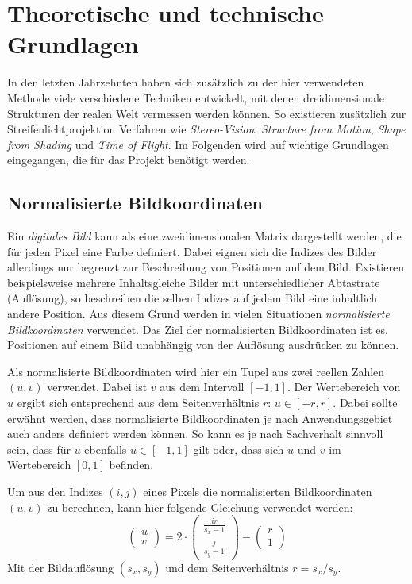 \documentclass[ngerman,a4paper,parskip=half]{scrartcl}
\begin{document}

\section{Theoretische und technische Grundlagen}
\label{sec:basics}

In den letzten Jahrzehnten haben sich zusätzlich zu der hier verwendeten Methode viele verschiedene Techniken entwickelt, mit denen dreidimensionale Strukturen der realen Welt vermessen werden können. So existieren zusätzlich zur Streifenlichtprojektion Verfahren wie \emph{Stereo-Vision}, \emph{Structure from Motion}, \emph{Shape from Shading} und \emph{Time of Flight}. Im Folgenden wird auf wichtige Grundlagen eingegangen, die für das Projekt benötigt werden.

\subsection{Normalisierte Bildkoordinaten}
\label{sec:imagecoordinates}

Ein \emph{digitales Bild} kann als eine zweidimensionalen Matrix dargestellt werden, die für jeden Pixel eine Farbe definiert. Dabei eignen sich die Indizes des Bilder allerdings nur begrenzt zur Beschreibung von Positionen auf dem Bild. Existieren beispielsweise mehrere Inhaltsgleiche Bilder mit unterschiedlicher Abtastrate (Auflösung), so beschreiben die selben Indizes auf jedem Bild eine inhaltlich andere Position. Aus diesem Grund werden in vielen Situationen \emph{normalisierte Bildkoordinaten} verwendet. Das Ziel der normalisierten Bildkoordinaten ist es, Positionen auf einem Bild unabhängig von der Auflösung ausdrücken zu können.

Als normalisierte Bildkoordinaten wird hier ein Tupel aus zwei reellen Zahlen $(u,v)$ verwendet. Dabei ist $v$ aus dem Intervall $[-1,1]$. Der Wertebereich von $u$ ergibt sich entsprechend aus dem Seitenverhältnis $r$: $u \in [-r,r]$. Dabei sollte erwähnt werden, dass normalisierte Bildkoordinaten je nach Anwendungsgebiet auch anders definiert werden können. So kann es je nach Sachverhalt sinnvoll sein, dass für $u$ ebenfalls $u \in [-1,1]$ gilt oder, dass sich $u$ und $v$ im Wertebereich $[0,1]$ befinden.

Um aus den Indizes $(i,j)$ eines Pixels die normalisierten Bildkoordinaten $(u,v)$ zu berechnen, kann hier folgende Gleichung verwendet werden:
\[ \begin{pmatrix}
u \\ v
\end{pmatrix} = 2 \cdot \begin{pmatrix}
\frac{i r}{s_x - 1} \\
\frac{j}{s_y - 1}
\end{pmatrix} - \begin{pmatrix}
r \\ 1
\end{pmatrix} \]
Mit der Bildauflösung $(s_x, s_y)$ und dem Seitenverhältnis $r = s_x/s_y$.
\end{document}
